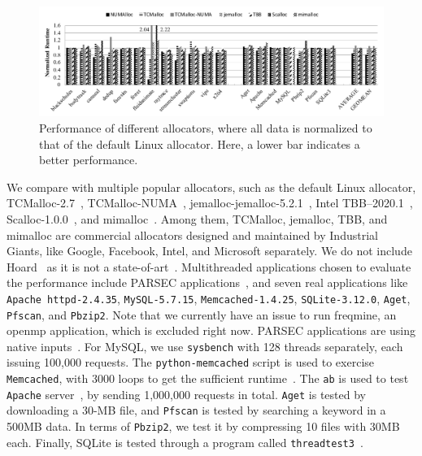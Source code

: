 \label{sec:performance}
\begin{figure}[!ht]
    \centering

    \includegraphics[width=6.5in]{figure/8-node-parsec-perf.pdf}
    \caption{Performance of different allocators, where all data is normalized to \\ that of the default Linux allocator. Here, a lower bar indicates a better performance.
    \label{fig:perf}}
 \end{figure}
 We compare \NM{} with multiple popular allocators, such as the default Linux allocator, TCMalloc-2.7~\cite{tcmalloc},  TCMalloc-NUMA~\cite{tcmallocnew}, jemalloc-jemalloc-5.2.1~\cite{jemalloc}, Intel TBB--2020.1~\cite{tbb}, Scalloc-1.0.0~\cite{Scalloc}, and mimalloc~\cite{mimalloc}. Among them, TCMalloc, jemalloc, TBB, and mimalloc are commercial allocators designed and maintained by Industrial Giants, like Google, Facebook, Intel, and Microsoft separately. We do not include Hoard~\cite{Hoard} as it is not a state-of-art~\cite{Scalloc, mimalloc}. Multithreaded applications chosen to evaluate the performance include PARSEC applications~\cite{parsec}, and seven real applications like \texttt{Apache httpd-2.4.35}, \texttt{MySQL-5.7.15}, \texttt{Memcached-1.4.25}, \texttt{SQLite-3.12.0}, \texttt{Aget}, \texttt{Pfscan}, and \texttt{Pbzip2}. Note that we currently have an issue to run freqmine, an openmp application, which is excluded right now. 
PARSEC applications are using native inputs~\cite{parsec}. For MySQL, we use \texttt{sysbench} with 128 threads separately, each issuing 100,000 requests. The \texttt{python-memcached} script is used to exercise \texttt{Memcached}, with 3000 loops to get the sufficient runtime~\cite{memcached}. The \texttt{ab} is used to test \texttt{Apache} server~\cite{apachetest}, by sending 1,000,000 requests in total. \texttt{Aget} is tested by downloading a 30-MB file, and \texttt{Pfscan} is tested by searching  a keyword in a 500MB data. In terms of \texttt{Pbzip2}, we test it by compressing 10 files with 30MB each. Finally, SQLite is tested through a program called \texttt{threadtest3}~\cite{sqlitetest}. 

